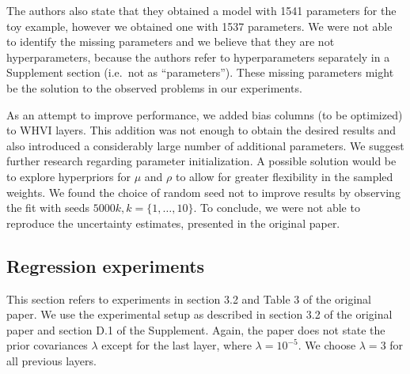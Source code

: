The authors also state that they obtained a model with 1541 parameters for the toy example, however we obtained one with 1537 parameters.
We were not able to identify the missing parameters and we believe that they are not hyperparameters, because the authors refer to hyperparameters separately in a Supplement section (i.e.\ not as ``parameters'').
These missing parameters might be the solution to the observed problems in our experiments.

As an attempt to improve performance, we added bias columns (to be optimized) to WHVI layers.
This addition was not enough to obtain the desired results and also introduced a considerably large number of additional parameters.
We suggest further research regarding parameter initialization.
A possible solution would be to explore hyperpriors for $\mu$ and $\rho$ to allow for greater flexibility in the sampled weights.
We found the choice of random seed not to improve results by observing the fit with seeds $5000k, k = \{1, \dots, 10\}$.
To conclude, we were not able to reproduce the uncertainty estimates, presented in the original paper.

\subsection{Regression experiments}\label{subsec:regression-experiments}
This section refers to experiments in section 3.2 and Table 3 of the original paper.
We use the experimental setup as described in section 3.2 of the original paper and section D.1 of the Supplement.
Again, the paper does not state the prior covariances $\lambda$ except for the last layer, where $\lambda = 10^{-5}$.
We choose $\lambda = 3$ for all previous layers.

